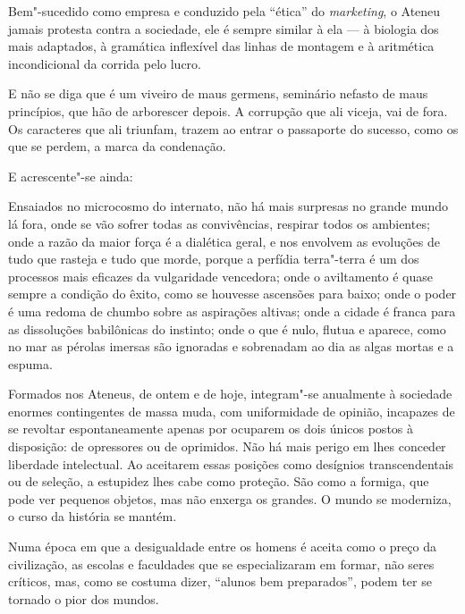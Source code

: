 Bem"-sucedido como empresa e conduzido pela ``ética'' do
\textit{marketing}, o Ateneu jamais protesta
contra a sociedade, ele é sempre similar à ela --- à biologia dos mais
adaptados, à gramática inflexível das linhas de montagem e à aritmética
incondicional da corrida pelo lucro. 

\begin{hedraquote}
E não se diga que é um viveiro de maus germens,
seminário nefasto de maus princípios, que hão de arborescer depois. A
corrupção que ali viceja, vai de fora. Os caracteres que ali triunfam,
trazem ao entrar o passaporte do sucesso, como os que se perdem, a
marca da condenação.
\end{hedraquote}

E acrescente"-se ainda: 

\begin{hedraquote}
Ensaiados no microcosmo do internato, não há mais surpresas no
grande mundo lá fora, onde se vão sofrer todas as convivências,
respirar todos os ambientes; onde a razão da maior força é a dialética
geral, e nos envolvem as evoluções de tudo que rasteja e tudo que
morde, porque a perfídia terra"-terra é um dos processos mais eficazes
da vulgaridade vencedora; onde o aviltamento é quase sempre a condição
do êxito, como se houvesse ascensões para baixo; onde o poder é uma
redoma de chumbo sobre as aspirações altivas; onde a cidade é franca
para as dissoluções babilônicas do instinto; onde o que é nulo, flutua
e aparece, como no mar as pérolas imersas são ignoradas e sobrenadam ao
dia as algas mortas e a espuma.
\end{hedraquote}

Formados nos Ateneus, de ontem e de hoje, integram"-se anualmente à
sociedade enormes contingentes de massa muda, com uniformidade de
opinião, incapazes de se revoltar espontaneamente apenas por ocuparem
os dois únicos postos à disposição: de opressores ou de oprimidos. Não
há mais perigo em lhes conceder liberdade intelectual. Ao aceitarem
essas posições como desígnios transcendentais ou de seleção, a
estupidez lhes cabe como proteção. São como a formiga, que pode ver
pequenos objetos, mas não enxerga os grandes. O mundo se moderniza, o
curso da história se mantém.

Numa época em que a desigualdade entre os homens é aceita como o preço
da civilização, as escolas e faculdades que se especializaram em
formar, não seres críticos, mas, como se costuma dizer, ``alunos bem
preparados'', podem ter se tornado o pior dos mundos.



